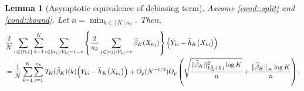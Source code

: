 \documentclass[11pt]{article}
\theoremstyle{plain}
\newtheorem{lemma}{Lemma}
\theoremstyle{definition}
\theoremstyle{remark}
\theoremstyle{definition}
\begin{document}
\begin{lemma}[Asymptotic equivalence of debiasing term]
Assume \ref{cond::split} and \ref{cond::bound}. Let $n = \min_{k \in [K] n_k}$. Then,
    \begin{align*}
      &   \frac{2}{N} \sum_{v \in \{0,1\}} \sum_{k=1}^K \sum_{i \in [n_k]: V_{ki} = 1-v}   \left\{\frac{2}{n_k}  \sum_{j \in [n_k]:  V_{kj} = v} \widehat{\beta}_K(X_{kj})\right\}\Bigl(Y_{ki} - \widehat{h}_K\bigl(X_{ki}\bigr)\Bigr)\\
         &=  \frac{1}{N}   \sum_{k=1}^K \sum_{i=1}^{n_k}  \mathcal{T}_{K}(\widehat{\beta}_K)(k) \Bigl(Y_{ki} - \widehat{h}_K\bigl(X_{ki}\bigr)\Bigr) +  O_p(N^{-1/2}) O_p\left( \sqrt{\frac{\|\widehat{\beta}_K\|_{L^2_K(X)}^2 \log K}{n}} + \frac{\|\widehat{\beta}_K\|_{\infty} \log K}{n} \right).
\end{align*} 
\label{lemma::biasExpectation}
\end{lemma} 
\end{document}
